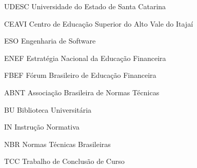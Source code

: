 
\listoffigures*
\cleardoublepage



\listoftables*
\cleardoublepage

\begin{siglas}
	\item[UDESC] Universidade do Estado de Santa Catarina
	\item[CEAVI] Centro de Educação Superior do Alto Vale do Itajaí
	\item[ESO] Engenharia de Software

	\item[ENEF] Estratégia Nacional da Educação Financeira
	\item[FBEF] Fórum Brasileiro de Educação Financeira





	\item[ABNT] Associação Brasileira de Normas Técnicas
	\item[BU] Biblioteca Universitária
	\item[IN] Instrução Normativa
	\item[NBR] Normas Técnicas Brasileiras
	\item[TCC] Trabalho de Conclusão de Curso

\end{siglas}
